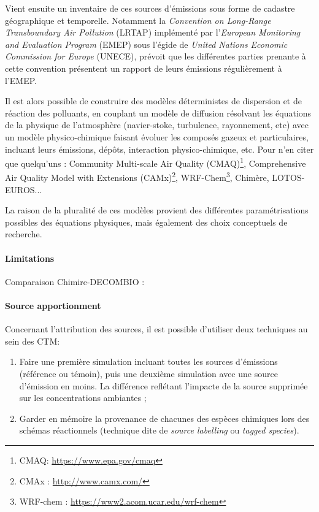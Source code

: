 Vient ensuite un inventaire de ces sources d'émissions sous forme de cadastre géographique
et temporelle. Notamment la \textit{Convention on Long-Range Transboundary Air
Pollution} (LRTAP) implémenté par l'\textit{European Monitoring and Evaluation Program}
(EMEP) sous l'égide de \textit{United Nations Economic Commission for Europe} (UNECE),
prévoit que les différentes parties prenante à cette convention présentent un rapport de
leurs émissions régulièrement à l'EMEP.

Il est alors possible de construire des modèles déterministes de dispersion et de
réaction des polluants, en couplant un modèle de diffusion résolvant les équations de la
physique de l'atmosphère (navier-stoke, turbulence, rayonnement, etc) avec un modèle
physico-chimique faisant évoluer les composés gazeux et particulaires, incluant leurs
émissions, dépôts, interaction physico-chimique, etc. Pour n'en citer que quelqu'uns : 
Community Multi-scale Air Quality (CMAQ)\footnote{CMAQ: \url{https://www.epa.gov/cmaq}},
Comprehensive Air Quality Model with Extensions (CAMx)\footnote{CMAx : \url{http://www.camx.com/}},
WRF-Chem\footnote{WRF-chem : \url{https://www2.acom.ucar.edu/wrf-chem}},
Chimère,
LOTOS-EUROS...

La raison de la pluralité de ces modèles provient des différentes paramétrisations
possibles des équations physiques, mais également des choix conceptuels de recherche.

\paragraph{Limitations}%
\label{par:limitations}

Comparaison Chimire-DECOMBIO : \textcite{bessagnetHigh2020}

\paragraph{Source apportionment}%
\label{par:source_apportionment}

Concernant l'attribution des sources, il est possible d'utiliser deux techniques au sein
des CTM:

\begin{enumerate}
    \item Faire une première simulation incluant toutes les sources d'émissions (référence
        ou témoin), puis une deuxième simulation avec une source d'émission en moins. La
        différence reflétant l'impacte de la source supprimée sur les concentrations
        ambiantes ;
    \item Garder en mémoire la provenance de chacunes des espèces chimiques lors des
        schémas réactionnels (technique dite de \textit{source labelling} ou \textit{tagged species}).
\end{enumerate}

